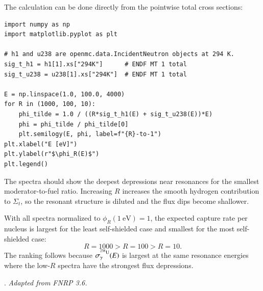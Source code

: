 \begin{adaptedsolution}
The calculation can be done directly from the pointwise total cross sections:
\begin{verbatim}
import numpy as np
import matplotlib.pyplot as plt

# h1 and u238 are openmc.data.IncidentNeutron objects at 294 K.
sig_t_h1 = h1[1].xs["294K"]      # ENDF MT 1 total
sig_t_u238 = u238[1].xs["294K"]  # ENDF MT 1 total

E = np.linspace(1.0, 100.0, 4000)
for R in (1000, 100, 10):
    phi_tilde = 1.0 / ((R*sig_t_h1(E) + sig_t_u238(E))*E)
    phi = phi_tilde / phi_tilde[0]
    plt.semilogy(E, phi, label=f"{R}-to-1")
plt.xlabel("E [eV]")
plt.ylabel(r"$\phi_R(E)$")
plt.legend()
\end{verbatim}

The spectra should show the deepest depressions near  resonances
for the smallest moderator-to-fuel ratio.  Increasing $R$ increases the smooth
hydrogen contribution to $\Sigma_t$, so the resonant  structure is
diluted and the flux dips become shallower.

With all spectra normalized to $\phi_R(1~\mathrm{eV})=1$, the expected capture
rate per  nucleus is largest for the least self-shielded case and
smallest for the most self-shielded case:
\[
 \boxed{R=1000 > R=100 > R=10}.
\]
The ranking follows because $\sigma_\gamma^{\isoA{U}{238}}(E)$ is largest at
the same resonance energies where the low-$R$ spectra have the strongest flux
depressions.
\end{adaptedsolution}

\newpage

. \emph{Adapted from FNRP 3.6.}

